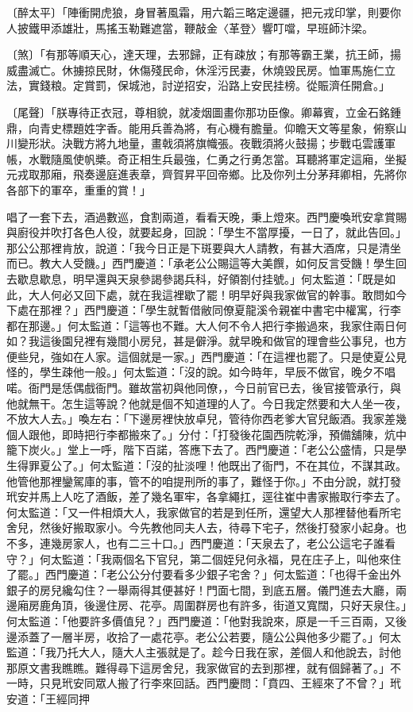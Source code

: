 \begin{showcontents}{}
〔醉太平〕「陣衝開虎狼，身冒著風霜，用六韜三略定邊疆，把元戎印掌，則要你人披鐵甲添雄壯，馬搖玉勒難遮當，鞭敲金〈革登〉響叮噹，早班師汴梁。

〔煞〕「有那等順天心，達天理，去邪歸，正有疎放；有那等霸王業，抗王師，揚威盡滅亡。休擄掠民財，休傷殘民命，休淫污民妻，休燒毀民房。恤軍馬施仁立法，實錢粮。定賞罰，保城池，討逆招安，沿路上安民挂榜。從賑濟任開倉。」

〔尾聲〕「朕專待正衣冠，尊相貌，就凌烟圖畫你那功臣像。卿幕賓，立金石銘鍾鼎，向青史標題姓字香。能用兵善為將，有心機有膽量。仰瞻天文等星象，俯察山川變形狀。決戰方將九地量，畫戟須將旗幟張。夜戰須將火鼓揚；步戰屯雲護軍帳，水戰隨風使帆槳。奇正相生兵最強，仁勇之行勇怎當。耳聽將軍定這廂，坐擬元戎取那廂，飛奏邊庭進表章，齊賀昇平回帝鄉。比及你列土分茅拜卿相，先將你各部下的軍卒，重重的賞！」

唱了一套下去，酒過數巡，食割兩道，看看天晚，秉上燈來。西門慶喚玳安拿賞賜與廚役并吹打各色人役，就要起身，回說：「學生不當厚擾，一日了，就此告回。」那公公那裡肯放，說道：「我今日正是下斑要與大人請教，有甚大酒席，只是清坐而已。教大人受饑。」西門慶道：「承老公公賜這等大美饌，如何反言受饑！學生回去歇息歇息，明早還與天泉參謁參謁兵科，好領劄付挂號。」何太監道：「既是如此，大人何必又回下處，就在我這裡歇了罷！明早好與我家做官的幹事。敢問如今下處在那裡？」西門慶道：「學生就暫借敝同僚夏龍溪令親崔中書宅中權寓，行李都在那邊。」何太監道：「這等也不難。大人何不令人把行李搬過來，我家住兩日何如？我這後園兒裡有幾間小房兒，甚是僻淨。就早晚和做官的理會些公事兒，也方便些兒，強如在人家。這個就是一家。」西門慶道：「在這裡也罷了。只是使夏公見怪的，學生疎他一般。」何太監道：「沒的說。如今時年，早辰不做官，晚夕不唱喏。衙門是恁偶戲衙門。雖故當初與他同僚，，今日前官已去，後官接管承行，與他就無干。怎生這等說？他就是個不知道理的人了。今日我定然要和大人坐一夜，不放大人去。」喚左右：「下邊房裡快放卓兒，管待你西老爹大官兒飯酒。我家差幾個人跟他，即時把行李都搬來了。」分付：「打發後花園西院乾淨，預備舖陳，炕中籠下炭火。」堂上一呼，階下百諾，答應下去了。西門慶道：「老公公盛情，只是學生得罪夏公了。」何太監道：「沒的扯淡哩！他既出了衙門，不在其位，不謀其政。他管他那裡鑾駕庫的事，管不的咱提刑所的事了，難怪于你。」不由分說，就打發玳安并馬上人吃了酒飯，差了幾名軍牢，各拿繩扛，逕往崔中書家搬取行李去了。何太監道：「又一件相煩大人，我家做官的若是到任所，還望大人那裡替他看所宅舍兒，然後好搬取家小。今先教他同夫人去，待尋下宅子，然後打發家小起身。也不多，連幾房家人，也有二三十口。」西門慶道：「天泉去了，老公公這宅子誰看守？」何太監道：「我兩個名下官兒，第二個姪兒何永福，見在庄子上，叫他來住了罷。」西門慶道：「老公公分付要看多少銀子宅舍？」何太監道：「也得千金出外銀子的房兒纔勾住？一舉兩得其便甚好！門面七間，到底五層。儀門進去大廳，兩邊廂房鹿角頂，後邊住房、花亭。周圍群房也有許多，街道又寬闊，只好天泉住。」何太監道：「他要許多價值兒？」西門慶道：「他對我說來，原是一千三百兩，又後邊添蓋了一層半房，收拾了一處花亭。老公公若要，隨公公與他多少罷了。」何太監道：「我乃托大人，隨大人主張就是了。趁今日我在家，差個人和他說去，討他那原文書我瞧瞧。難得尋下這房舍兒，我家做官的去到那裡，就有個歸著了。」不一時，只見玳安同眾人搬了行李來回話。西門慶問：「賁四、王經來了不曾？」玳安道：「王經同押
\end{showcontents}
